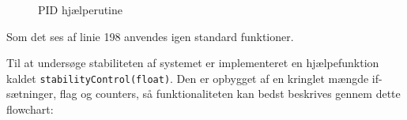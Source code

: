 \begin{figure}[H]
\centering
{}
\caption[Diagram]{PID hjælperutine}
\label{fig:PIDRutine}
\end{figure}

Som det ses af linie 198 anvendes igen standard funktioner.

Til at undersøge stabiliteten af systemet er implementeret en hjælpefunktion kaldet \texttt{stabilityControl(float)}. Den er opbygget af en kringlet mængde if-sætninger, flag og counters, så funktionaliteten kan bedst beskrives gennem dette flowchart:

